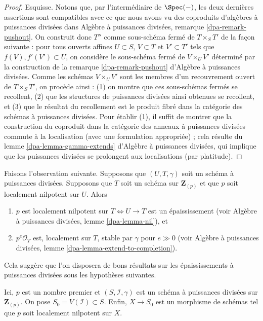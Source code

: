 \begin{proof}
Esquisse. Notons que, par l'intermédiaire de $\Spec(-)$, les deux dernières assertions
sont compatibles avec ce que nous avons vu des coproduits d'algèbres à puissances divisées dans
Algèbre à puissances divisées, remarque \ref{dpa-remark-pushout}.
On construit donc $T''$ comme sous-schéma fermé de $T \times_S T'$
de la façon suivante : pour tous ouverts affines $U \subset S$, $V \subset T$ et
$V' \subset T'$ tels que $f(V), f'(V') \subset U$, on considère le sous-schéma
fermé de $V \times_U V'$ déterminé par la construction de la
remarque \ref{dpa-remark-pushout} d'Algèbre à puissances divisées. Comme les
schémas $V \times_U V'$ sont les membres d'un recouvrement ouvert
de $T \times_S T'$, on procède ainsi : (1) on montre que ces
sous-schémas fermés se recollent, (2) que les
structures de puissances divisées ainsi obtenues se recollent, et (3) que le résultat du recollement
est le produit fibré dans la catégorie des schémas à puissances divisées.
Pour établir (1), il suffit de montrer
que la construction du coproduit dans la catégorie des
anneaux à puissances divisées commute à la localisation (avec une formulation
appropriée) ; cela résulte du
lemme \ref{dpa-lemma-gamma-extends} d'Algèbre à puissances divisées, qui implique
que les puissances divisées se prolongent aux localisations (par platitude).
\end{proof}

\noindent
Faisons l'observation suivante. Supposons que $(U, T, \gamma)$
soit un schéma à puissances divisées. Supposons que $T$ soit un schéma sur $\mathbf{Z}_{(p)}$
et que $p$ soit localement nilpotent sur $U$. Alors
\begin{enumerate}
\item $p$ est localement nilpotent sur $T \Leftrightarrow U \to T$
est un épaississement (voir Algèbre à puissances divisées, lemme \ref{dpa-lemma-nil}), et
\item $p^e\mathcal{O}_T$ est, localement sur $T$, stable par $\gamma$
pour $e \gg 0$ (voir
Algèbre à puissances divisées, lemme \ref{dpa-lemma-extend-to-completion}).
\end{enumerate}
Cela suggère que l'on disposera de bons résultats sur les épaississements à
puissances divisées sous les hypothèses suivantes.

\begin{situation}
\label{situation-global}
Ici, $p$ est un nombre premier et $(S, \mathcal{I}, \gamma)$ est un schéma à
puissances divisées sur $\mathbf{Z}_{(p)}$. On pose $S_0 = V(\mathcal{I}) \subset S$.
Enfin, $X \to S_0$ est un morphisme de schémas tel que $p$ soit
localement nilpotent sur $X$.
\end{situation}

